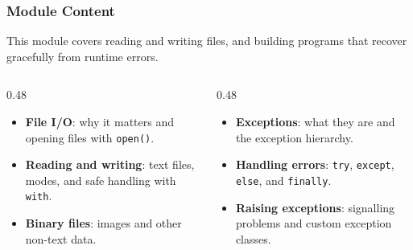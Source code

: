\documentclass[aspectratio=169,10pt]{beamer}
\newcommand{\keyword}[1]{\textcolor{PrimaryBlue}{\textbf{#1}}}
\newcommand{\codeword}[1]{\texttt{#1}}
\begin{document}
\begin{frame}
\frametitle{Module Content}
\small
This module covers reading and writing files, and building programs that recover gracefully from runtime errors.

\vspace{0.16cm}
\begin{columns}[T,totalwidth=0.96\textwidth]
\begin{column}{0.48\textwidth}
\begin{itemize}\setlength\itemsep{0.08cm}
  \item \keyword{File I/O}: why it matters and opening files with \codeword{open()}.
  \item \keyword{Reading and writing}: text files, modes, and safe handling with \codeword{with}.
  \item \keyword{Binary files}: images and other non-text data.
\end{itemize}
\end{column}
\begin{column}{0.48\textwidth}
\begin{itemize}\setlength\itemsep{0.08cm}
  \item \keyword{Exceptions}: what they are and the exception hierarchy.
  \item \keyword{Handling errors}: \codeword{try}, \codeword{except}, \codeword{else}, and \codeword{finally}.
  \item \keyword{Raising exceptions}: signalling problems and custom exception classes.
\end{itemize}
\end{column}
\end{columns}
\end{frame}
\end{document}
